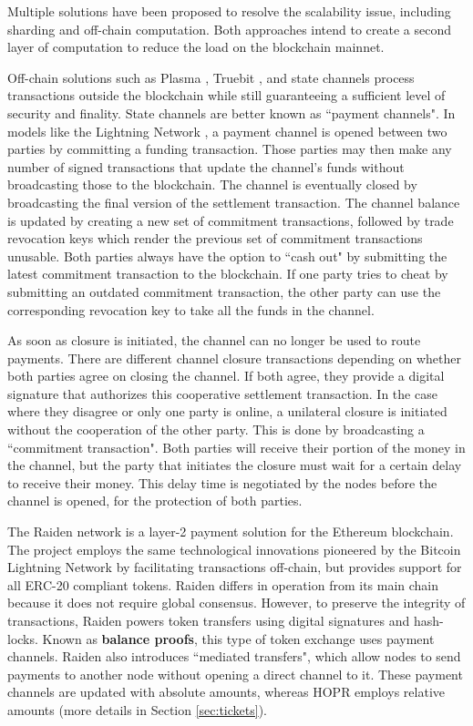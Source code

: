 Multiple solutions have been proposed to resolve the scalability issue, including sharding and off-chain computation. Both approaches intend to create a second layer of computation to reduce the load on the blockchain mainnet.

Off-chain solutions such as Plasma \cite{plasma}, Truebit \cite{truebit}, and state channels process transactions outside the blockchain while still guaranteeing a sufficient level of security and finality. State channels are better known as ``payment channels". In models like the Lightning Network \cite{lightningnetwork}, a payment channel is opened between two parties by committing a funding transaction. Those parties may then make any number of signed transactions that update the channel's funds without broadcasting those to the blockchain. The channel is eventually closed by broadcasting the final version of the settlement transaction. The channel balance is updated by creating a new set of commitment transactions, followed by trade revocation keys which render the previous set of commitment transactions unusable. Both parties always have the option to ``cash out" by submitting the latest commitment transaction to the blockchain. If one party tries to cheat by submitting an outdated commitment transaction, the other party can use the corresponding revocation key to take all the funds in the channel.

As soon as closure is initiated, the channel can no longer be used to route payments. There are different channel closure transactions depending on whether both parties agree on closing the channel. If both agree, they provide a digital signature that authorizes this cooperative settlement transaction. In the case where they disagree or only one party is online, a unilateral closure is initiated without the cooperation of the other party. This is done by broadcasting a ``commitment transaction". Both parties will receive their portion of the money in the channel, but the party that initiates the closure must wait for a certain delay to receive their money. This delay time is negotiated by the nodes before the channel is opened, for the protection of both parties.

The Raiden network \cite{raiden} is a layer-2 payment solution for the Ethereum blockchain. The project employs the same technological innovations pioneered by the Bitcoin Lightning Network by facilitating transactions off-chain, but provides support for all ERC-20 compliant tokens. Raiden differs in operation from its main chain because it does not require global consensus. However, to preserve the integrity of transactions, Raiden powers token transfers using digital signatures and hash-locks. Known as \textbf{balance proofs}, this type of token exchange uses payment channels. Raiden also introduces ``mediated transfers", which allow nodes to send payments to another node without opening a direct channel to it. These payment channels are updated with absolute amounts, whereas HOPR employs relative amounts (more details in Section \ref{sec:tickets}).

